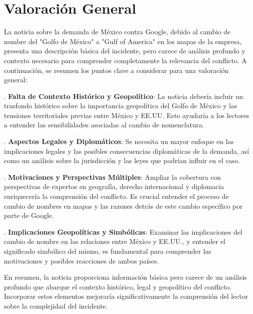 \documentclass[10pt,a4paper]{article}
\begin{document}
\section*{Valoración General}
    La noticia sobre la demanda de M\'{e}xico contra Google, debido al cambio de nombre del "Golfo de M\'{e}xico" a "Gulf of America" en los mapas de la empresa, presenta una descripci\'{o}n b\'{a}sica del incidente, pero carece de an\'{a}lisis profundo y contexto necesario para comprender completamente la relevancia del conflicto. A continuaci\'{o}n, se resumen los puntos clave a considerar para una valoraci\'{o}n general:
\par{}. \textbf{Falta de Contexto Hist\'{o}rico y Geopol\'{i}tico}: La noticia deber\'{i}a incluir un trasfondo hist\'{o}rico sobre la importancia geopol\'{i}tica del Golfo de M\'{e}xico y las tensiones territoriales previas entre M\'{e}xico y EE.UU. Esto ayudar\'{i}a a los lectores a entender las sensibilidades asociadas al cambio de nomenclatura.
\par{}. \textbf{Aspectos Legales y Diplom\'{a}ticos}: Se necesita un mayor enfoque en las implicaciones legales y las posibles consecuencias diplom\'{a}ticas de la demanda, as\'{i} como un an\'{a}lisis sobre la jurisdicci\'{o}n y las leyes que podr\'{i}an influir en el caso.
\par{}. \textbf{Motivaciones y Perspectivas M\'{u}ltiples}: Ampliar la cobertura con perspectivas de expertos en geograf\'{i}a, derecho internacional y diplomacia enriquecer\'{i}a la comprensi\'{o}n del conflicto. Es crucial entender el proceso de cambio de nombres en mapas y las razones detr\'{a}s de este cambio espec\'{i}fico por parte de Google.
\par{}. \textbf{Implicaciones Geopol\'{i}ticas y Simb\'{o}licas}: Examinar las implicaciones del cambio de nombre en las relaciones entre M\'{e}xico y EE.UU., y entender el significado simb\'{o}lico del mismo, es fundamental para comprender las motivaciones y posibles reacciones de ambos pa\'{i}ses.
\par\medskip
En resumen, la noticia proporciona informaci\'{o}n b\'{a}sica pero carece de un an\'{a}lisis profundo que abarque el contexto hist\'{o}rico, legal y geopol\'{i}tico del conflicto. Incorporar estos elementos mejorar\'{i}a significativamente la comprensi\'{o}n del lector sobre la complejidad del incidente.
\vspace{1em}

\end{document}
